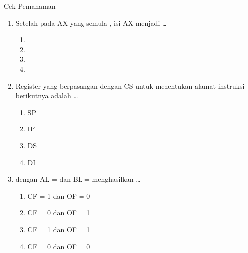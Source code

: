 \documentclass[aspectratio=169,11pt]{beamer}
\begin{document}
\begin{frame}{Cek Pemahaman}
\footnotesize
\begin{enumerate}
    \item Setelah  pada AX yang semula
          , isi AX menjadi \dots
          \begin{enumerate}
              \item {} \quad \item {} \quad
              \item {} \quad \item {}
          \end{enumerate}

    \vspace{0.2em}
    \item Register yang berpasangan dengan CS untuk menentukan
          alamat instruksi berikutnya adalah \dots
          \begin{enumerate}
              \item SP \quad \item IP \quad
              \item DS \quad \item DI
          \end{enumerate}

    \vspace{0.2em}
    \item {} dengan AL =  dan BL = 
          menghasilkan \dots
          \begin{enumerate}
              \item CF = 1 dan OF = 0
              \item CF = 0 dan OF = 1
              \item CF = 1 dan OF = 1
              \item CF = 0 dan OF = 0
          \end{enumerate}
\end{enumerate}
\end{frame}
\end{document}
